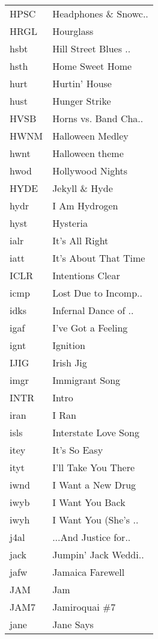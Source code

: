 \begin{supertabular}{ll}
 HPSC &  Headphones \& Snowc.. \\
 HRGL &             Hourglass \\
 hsbt &  Hill Street Blues .. \\
 hsth &       Home Sweet Home \\
 hurt &         Hurtin' House \\
 hust &         Hunger Strike \\
 HVSB &  Horns vs. Band Cha.. \\
 HWNM &      Halloween Medley \\
 hwnt &       Halloween theme \\
 hwod &      Hollywood Nights \\
 HYDE &         Jekyll \& Hyde \\
 hydr &         I Am Hydrogen \\
 hyst &              Hysteria \\
 ialr &        It's All Right \\
 iatt &  It's About That Time \\
 ICLR &      Intentions Clear \\
 icmp &  Lost Due to Incomp.. \\
 idks &  Infernal Dance of .. \\
 igaf &    I've Got a Feeling \\
 ignt &              Ignition \\
 IJIG &             Irish Jig \\
 imgr &        Immigrant Song \\
 INTR &                 Intro \\
 iran &                 I Ran \\
 isls &  Interstate Love Song \\
 itey &          It's So Easy \\
 ityt &   I'll Take You There \\
 iwnd &     I Want a New Drug \\
 iwyb &       I Want You Back \\
 iwyh &  I Want You (She's .. \\
 j4al &  ...And Justice for.. \\
 jack &  Jumpin' Jack Weddi.. \\
 jafw &      Jamaica Farewell \\
  JAM &                   Jam \\
 JAM7 &         Jamiroquai \#7 \\
 jane &             Jane Says \\

\end{supertabular}
